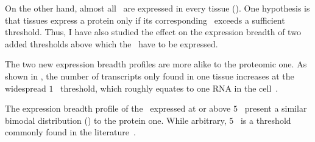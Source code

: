 On the other hand,
almost all \mRNAs\ are expressed in every tissue ().
One hypothesis is that tissues express a protein only
if its corresponding \mRNA\ exceeds a sufficient threshold.
Thus, I have also studied the effect on the expression breadth
of two added thresholds above which the \mRNAs\ have to be expressed.

The two new expression breadth profiles are more alike
to the proteomic one.
As shown in ,
the number of transcripts only found in one tissue increases
at the widespread $1$ \FPKM\ threshold,
which roughly equates to one \gls{RNA} in the cell~.

The expression breadth profile of the \mRNAs\ expressed at or above $5$ \FPKM\
present a similar bimodal distribution () to the protein one.
While arbitrary, $5$ \FPKM\ is a threshold commonly found
in the literature~.\\
\vspace{-\baselineskip}

